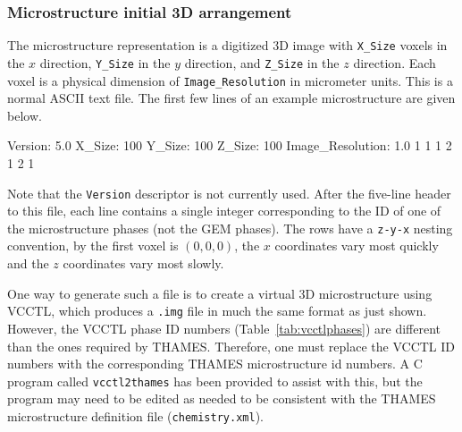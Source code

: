 \documentclass{article}
\begin{document}
\normalsize{ }
\subsubsection{Microstructure initial 3D arrangement}
The microstructure representation is a digitized 3D image with \verb!X_Size! voxels
in the $x$ direction, \verb!Y_Size! in the $y$ direction, and \verb!Z_Size!
in the $z$ direction.  Each voxel is a physical dimension of
\verb!Image_Resolution! in micrometer units.
This is a normal ASCII text file.  The first few lines of an example microstructure
are given below.

\small{
\begin{verbatim*}
Version: 5.0
X_Size: 100
Y_Size: 100
Z_Size: 100
Image_Resolution: 1.0
1
1
1
2
1
2
1
\end{verbatim*}
}

\normalsize{ }
Note that the \verb!Version! descriptor is not currently used.  After the five-line
header to this file, each line contains a single integer corresponding to the ID of
one of the microstructure phases (not the GEM phases).  The rows have a
\verb!z-y-x! nesting convention, by the first voxel is $(0,0,0)$, the $x$ coordinates
vary most quickly and the $z$ coordinates vary most slowly.

One way to generate such a file is to create a virtual 3D microstructure using VCCTL,
which produces a \verb!.img! file in much the same format as just shown.  However,
the VCCTL phase ID numbers (Table~\ref{tab:vcctlphases}) are different than the
ones required by THAMES.  Therefore, one must replace
the VCCTL ID numbers with the corresponding THAMES microstructure id numbers.
A C program called \verb!vcctl2thames! has been provided to assist with this, but the
program may need to be edited as needed to be consistent with the THAMES microstructure
definition file (\verb!chemistry.xml!).
\end{document}
